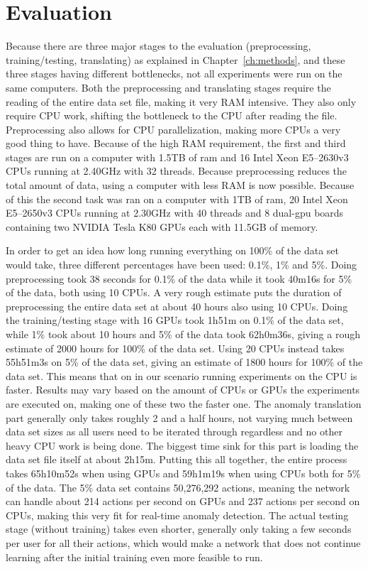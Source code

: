 \chapter{Evaluation}\label{ch:evaluation}

Because there are three major stages to the evaluation (preprocessing, training/testing, translating) as explained in Chapter~\ref{ch:methods}, and these three stages having different bottlenecks, not all experiments were run on the same computers. Both the preprocessing and translating stages require the reading of the entire data set file, making it very RAM intensive. They also only require CPU work, shifting the bottleneck to the CPU after reading the file. Preprocessing also allows for CPU parallelization, making more CPUs a very good thing to have. Because of the high RAM requirement, the first and third stages are run on a computer with 1.5TB of ram and 16 Intel Xeon E5--2630v3 CPUs running at 2.40GHz with 32 threads. Because preprocessing reduces the total amount of data, using a computer with less RAM is now possible.  Because of this the second task was ran on a computer with 1TB of ram, 20 Intel Xeon E5--2650v3 CPUs running at 2.30GHz with 40 threads and 8 dual-gpu boards containing two NVIDIA Tesla K80 GPUs each with 11.5GB of memory. 

In order to get an idea how long running everything on 100\% of the data set would take, three different percentages have been used: 0.1\%, 1\% and 5\%. Doing preprocessing took 38 seconds for 0.1\% of the data while it took 40m16s for 5\% of the data, both using 10 CPUs. A very rough estimate puts the duration of preprocessing the entire data set at about 40 hours also using 10 CPUs. Doing the training/testing stage with 16 GPUs took 1h51m on 0.1\% of the data set, while 1\% took about 10 hours and 5\% of the data took 62h0m36s, giving a rough estimate of 2000 hours for 100\% of the data set. Using 20 CPUs instead takes 55h51m3s on 5\% of the data set, giving an estimate of 1800 hours for 100\% of the data set. This means that on in our scenario running experiments on the CPU is faster. Results may vary based on the amount of CPUs or GPUs the experiments are executed on, making one of these two the faster one. The anomaly translation part generally only takes roughly 2 and a half hours, not varying much between data set sizes as all users need to be iterated through regardless and no other heavy CPU work is being done. The biggest time sink for this part is loading the data set file itself at about 2h15m. Putting this all together, the entire process takes 65h10m52s when using GPUs and 59h1m19s when using CPUs both for 5\% of the data. The 5\% data set contains 50,276,292 actions, meaning the network can handle about 214 actions per second on GPUs and 237 actions per second on CPUs, making this very fit for real-time anomaly detection. The actual testing stage (without training) takes even shorter, generally only taking a few seconds per user for all their actions, which would make a network that does not continue learning after the initial training even more feasible to run.